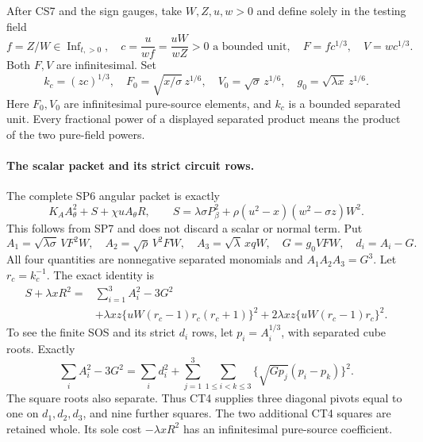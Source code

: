 After CS7 and the sign gauges, take $W,Z,u,w>0$ and define solely
in the testing field
\[
 f=Z/W\in\operatorname{Inf}_{t,>0},\quad
 c=\frac{u}{wf}=\frac{uW}{wZ}>0\text{ a bounded unit},\quad
 F=fc^{1/3},\quad V=wc^{1/3}.
\]
Both $F,V$ are infinitesimal.  Set
\[
 k_c=(zc)^{1/3},\quad
 F_0=\sqrt{x/\sigma}\,z^{1/6},\quad
 V_0=\sqrt\sigma\,z^{1/6},\quad
 g_0=\sqrt{\lambda x}\,z^{1/6}.
                                                               \tag{CT2}
\]
Here $F_0,V_0$ are infinitesimal pure-source elements, and $k_c$ is
a bounded separated unit.  Every fractional power of a displayed
separated product means the product of the two pure-field powers.

\paragraph{The scalar packet and its strict circuit rows.}
The complete SP6 angular packet is exactly
\[
 K_A A_\theta^2+S+\chi uA_\theta R,
 \qquad S=\lambda\sigma P_\beta^2+
                    \rho(u^2-x)(w^2-\sigma z)W^2.              \tag{CT3}
\]
This follows from SP7 and does not discard a scalar or normal term.
Put
\[
 A_1=\sqrt{\lambda\sigma}\,VF^2W,\quad
 A_2=\sqrt\rho\,V^2FW,\quad
 A_3=\sqrt\lambda\,xqW,\quad
 G=g_0VFW,\quad d_i=A_i-G.
\]
All four quantities are nonnegative separated monomials and
$A_1A_2A_3=G^3$.  Let $r_c=k_c^{-1}$.  The exact identity is
\[
\begin{split}
 S+\lambda xR^2={}&\sum_{i=1}^3A_i^2-3G^2\\
 &+\lambda xz\{uW(r_c-1)r_c(r_c+1)\}^2
   +2\lambda xz\{uW(r_c-1)r_c\}^2.             \end{split} \tag{CT4}
\]
To see the finite SOS and its strict $d_i$ rows, let
$p_i=A_i^{1/3}$, with separated cube roots.  Exactly
\[
 \sum_iA_i^2-3G^2
 =\sum_i d_i^2+
   \sum_{j=1}^3\sum_{1\le i<k\le3}
       \{\sqrt{Gp_j}(p_i-p_k)\}^2.             \tag{CT5}
\]
The square roots also separate.  Thus CT4 supplies three diagonal
pivots equal to one on $d_1,d_2,d_3$, and nine further squares.
The two additional CT4 squares are retained whole.  Its sole cost
$-\lambda xR^2$ has an infinitesimal pure-source coefficient.

